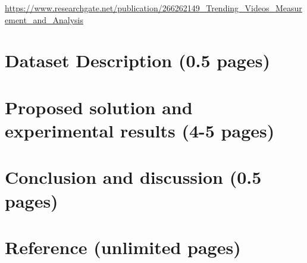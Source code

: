 \documentclass{article}
\begin{document}
\href{https://www.researchgate.net/publication/266262149_Trending_Videos_Measurement_and_Analysis}{https://www.researchgate.net/publication/266262149_Trending_Videos_Measurement_and_Analysis} \medskip


\section*{Dataset Description (0.5 pages)}
\section*{Proposed solution and experimental results (4-5 pages)}
\section*{Conclusion and discussion (0.5 pages)}
\section*{Reference (unlimited pages)}
\end{document}
